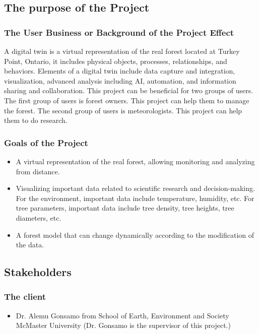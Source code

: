 \documentclass{article}
\begin{document}
\subsection{The purpose of the Project}
\subsubsection{The User Business or Background of the Project Effect}
A digital twin is a virtual representation of the real
forest located at Turkey Point, Ontario, it includes physical objects, 
processes, relationships, and behaviors. Elements of a digital twin
include data capture and integration, visualization,
advanced analysis including AI, automation, and information
sharing and collaboration. This project can be beneficial
for two groups of users.  The first group of users is forest owners. 
This project can help them to manage the forest. The second group of users is
meteorologists. This project can help them to do research. 

\subsubsection{Goals of the Project}
\begin{itemize}
\item A virtual representation of the real forest,
allowing monitoring and analyzing from distance.
\item Visualizing important data related to scientific 
research and decision-making. For the environment, 
important data include temperature, humidity, etc. 
For tree parameters, important data include tree density,
tree heights, tree diameters, etc.
\item A forest model that can change dynamically 
according to the modification of the data.
\end{itemize}

\subsection{Stakeholders}
\subsubsection{The client}
\begin{itemize}
\item Dr. Alemu Gonsamo from School of Earth,
    Environment and Society McMaster University (Dr.
    Gonsamo is the supervisor of this project.)
 
\end{itemize}
\end{document}
